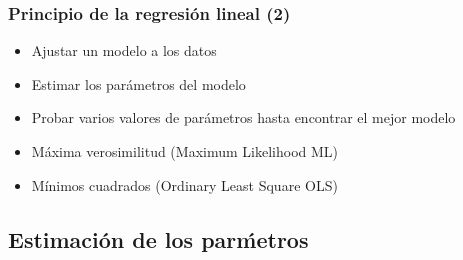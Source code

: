 \documentclass[gray,handout,mathserif]{beamer}
\begin{document}
\begin{frame}[label=obsgen]
   \frametitle{Principio de la regresi\'on lineal (2)}
    \begin{itemize}[<+-| handout:1>]
      \item Ajustar un modelo a los datos 
      \item Estimar los par\'ametros del modelo
      \item Probar varios valores de par\'ametros hasta encontrar el mejor modelo
      \item M\'axima verosimilitud (Maximum Likelihood ML)
      \item M\'inimos cuadrados (Ordinary Least Square OLS) 
   \end{itemize}
\end{frame}%


\subsection[Estimaci\'on]{Estimaci\'on de los par\'metros}
\end{document}
